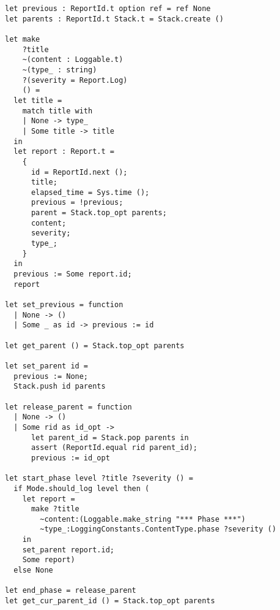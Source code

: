 \begin{lstlisting}[caption={
  The \texttt{ReportBuilder} module, including new functions for manually
  controlling the parent and previous report IDs
  \label{lst:reportbuilder}}, style=code]
let previous : ReportId.t option ref = ref None
let parents : ReportId.t Stack.t = Stack.create ()

let make
    ?title
    ~(content : Loggable.t)
    ~(type_ : string)
    ?(severity = Report.Log)
    () =
  let title =
    match title with
    | None -> type_
    | Some title -> title
  in
  let report : Report.t =
    {
      id = ReportId.next ();
      title;
      elapsed_time = Sys.time ();
      previous = !previous;
      parent = Stack.top_opt parents;
      content;
      severity;
      type_;
    }
  in
  previous := Some report.id;
  report

let set_previous = function
  | None -> ()
  | Some _ as id -> previous := id

let get_parent () = Stack.top_opt parents

let set_parent id =
  previous := None;
  Stack.push id parents

let release_parent = function
  | None -> ()
  | Some rid as id_opt ->
      let parent_id = Stack.pop parents in
      assert (ReportId.equal rid parent_id);
      previous := id_opt

let start_phase level ?title ?severity () =
  if Mode.should_log level then (
    let report =
      make ?title
        ~content:(Loggable.make_string "*** Phase ***")
        ~type_:LoggingConstants.ContentType.phase ?severity ()
    in
    set_parent report.id;
    Some report)
  else None

let end_phase = release_parent
let get_cur_parent_id () = Stack.top_opt parents
\end{lstlisting}

